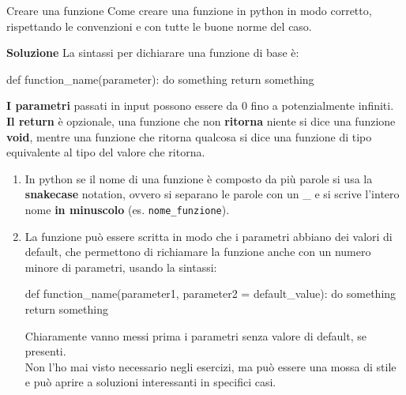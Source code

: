 \documentclass[10pt]{article}
\makeatletter
\newcommand{\<}{\langle}
\renewcommand{\>}{\rangle}
\renewenvironment{proof}[1][\proofname] {\par\pushQED{\qed}
\renewcommand*{\proofname}{Soluzione}
{\normalfont\sffamily\bfseries\topsep6\p@\@plus6\p@\relax #1\@addpunct{.} }}{\popQED\endtrivlist\@endpefalse}
\theoremstyle{mystyle}{\newtheorem*{remark}{Nota}}
\theoremstyle{mystyle}{\newtheorem*{remarks}{Note}}
\theoremstyle{mystyle}{\newtheorem*{example}{Esempio}}
\theoremstyle{mystyle}{\newtheorem*{examples}{Esempi}}
\theoremstyle{definition}{\newtheorem*{exercise}{Exercise}}
\theoremstyle{warn}
\makeatother
\begin{document}
\begin{definition}{Creare una funzione}{}
Come creare una funzione in python in modo corretto, rispettando le convenzioni e con tutte le buone norme del caso.
\end{definition}
\begin{proof}
La sintassi per dichiarare una funzione di base è:
\begin{python}
def function_name(parameter):
    do something
    return something
\end{python}
\textbf{I parametri} passati in input possono essere da 0 fino a potenzialmente infiniti.\\
\textbf{Il return} è opzionale, una funzione che non \textbf{ritorna} niente si dice una funzione \textbf{void}, mentre una funzione che ritorna qualcosa si dice una funzione di tipo equivalente al tipo del valore che ritorna.\\
\end{proof}
\begin{remarks} \leavevmode
\begin{enumerate}
    \item In python se il nome di una funzione è composto da più parole si usa la \textbf{snakecase} notation, ovvero si separano le parole con un \_ e si scrive l'intero nome \textbf{in minuscolo} (es. \texttt{nome\_funzione}).
    \item La funzione può essere scritta in modo che i parametri abbiano dei valori di default, che permettono di richiamare la funzione anche con un numero minore di parametri, usando la sintassi:
\begin{python}
def function_name(parameter1, parameter2 = default_value):
    do something
    return something
\end{python}
    Chiaramente vanno messi prima i parametri senza valore di default, se presenti.\\
    Non l'ho mai visto necessario negli esercizi, ma può essere una mossa di stile e può aprire a soluzioni interessanti in specifici casi.
\end{enumerate}
\end{remarks}
\end{document}
